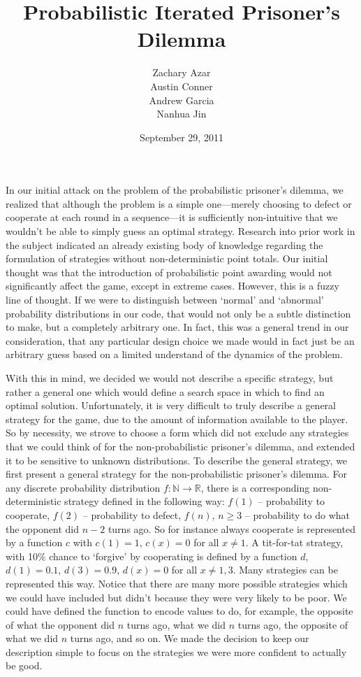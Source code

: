 \documentclass[11pt]{article}
\title{Probabilistic Iterated Prisoner's Dilemma}
\author{Zachary Azar\\Austin Conner\\Andrew Garcia\\ Nanhua Jin}
\date {September 29, 2011}
\begin{document}
\maketitle


In our initial attack on the problem of the probabilistic prisoner's dilemma, we realized that although the problem is a simple one---merely choosing to defect or cooperate at each round in a sequence---it is sufficiently non-intuitive that we wouldn't be able to simply guess an optimal strategy. Research into prior work in the subject indicated an already existing body of knowledge regarding the formulation of strategies without non-deterministic point totals. Our initial thought was that the introduction of probabilistic point awarding would not significantly affect the game, except in extreme cases. However, this is a fuzzy line of thought. If we were to distinguish between `normal' and `abnormal' probability distributions in our code, that would not only be a subtle distinction to make, but a completely arbitrary one. In fact, this was a general trend in our consideration, that any particular design choice we made would in fact just be an arbitrary guess based on a limited understand of the dynamics of the problem. 


With this in mind, we decided we would not describe a specific strategy, but rather a general one which would define a search space in which to find an optimal solution. Unfortunately, it is very difficult to truly describe a general strategy for the game, due to the amount of information available to the player. So by necessity, we strove to choose a form which did not exclude any strategies that we could think of for the non-probabilistic prisoner's dilemma, and extended it to be sensitive to unknown distributions. To describe the general strategy, we first present a general strategy for the non-probabilistic prisoner's dilemma. For any discrete probability distribution $f :\mathbb{N} \to \mathbb{R}$, there is a corresponding non-deterministic strategy defined in the following way: $f(1)$ -- probability to cooperate, $f(2)$ -- probability to defect, $f(n)$, $n \ge 3$ -- probability to do what the opponent did $n-2$ turns ago. So for instance always cooperate is represented by a function $c$ with $c(1)=1$, $c(x)=0$ for all $x \ne 1$. A tit-for-tat strategy, with 10\% chance to `forgive' by cooperating is defined by a function $d$, $d(1)=0.1$, $d(3)=0.9$, $d(x)=0$ for all $x \ne 1, 3$. Many strategies can be represented this way. Notice that there are many more possible strategies which we could have included but didn’t because they were very likely to be poor. We could have defined the function to encode values to do, for example, the opposite of what the opponent did $n$ turns ago, what we did $n$ turns ago, the opposite of what we did $n$ turns ago, and so on. We made the decision to keep our description simple to focus on the strategies we were more confident to actually be good. 
\end{document}
